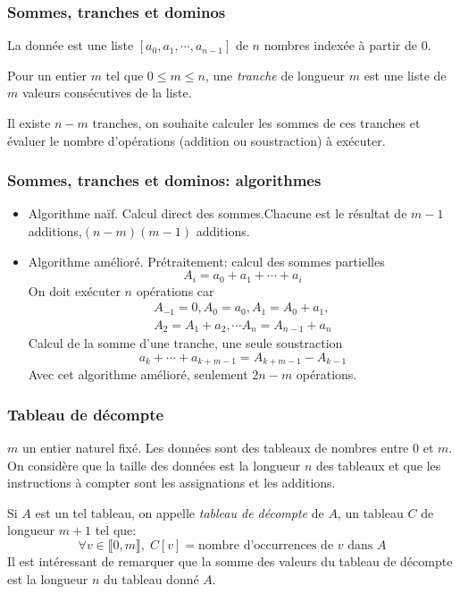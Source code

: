 \begin{frame}
  \frametitle{Sommes, tranches et dominos}
La donnée est une liste $[a_0,a_1,\cdots,a_{n-1}]$ de $n$ nombres indexée à partir de $0$. 

Pour un entier $m$ tel que $0\leq m \leq n$, une \emph{tranche} de longueur $m$ est une liste de $m$ valeurs consécutives de la liste. 

Il existe $n-m$ tranches, on souhaite calculer les sommes de ces tranches et évaluer le nombre d'opérations (addition ou soustraction) à exécuter.
\end{frame}

\begin{frame}
  \frametitle{Sommes, tranches et dominos: algorithmes}
\begin{itemize}
  \item Algorithme naïf. Calcul direct des sommes.\newline Chacune est le résultat de $m-1$ additions,\newline $(n-m)(m-1)$ additions. 
  \item Algorithme amélioré. Prétraitement: calcul des sommes partielles
\begin{displaymath}
  A_i = a_0 + a_1 + \cdots + a_i
\end{displaymath}
On doit exécuter $n$ opérations car 
\begin{multline*}
A_{-1} = 0, A_0 = a_0, A_1 = A_0 + a_1,\\ A_2 = A_1 + a_2,\cdots A_n = A_{n-1} + a_n
\end{multline*}
Calcul de la somme d'une tranche, une seule soustraction
\begin{displaymath}
  a_k+\cdots+a_{k+m-1} = A_{k+m-1} - A_{k-1}
\end{displaymath}
Avec cet algorithme amélioré, seulement $2n-m$ opérations.
\end{itemize}
\end{frame}

\begin{frame}
  \frametitle{Tableau de décompte}
$m$ un entier naturel fixé. Les données sont des tableaux de nombres entre $0$ et $m$. On considère que la taille des données est la longueur $n$ des tableaux et que les instructions à compter sont les assignations et les additions.

Si $A$ est un tel tableau, on appelle \emph{tableau de décompte} de $A$, un tableau $C$ de longueur $m+1$ tel que: 
\begin{displaymath}
  \forall v\in \llbracket 0, m \rrbracket,\; C[v] = \text{nombre d'occurrences de $v$ dans $A$}
\end{displaymath}
Il est intéressant de remarquer que la somme des valeurs du tableau de décompte est la longueur $n$ du tableau donné $A$.
\end{frame}

